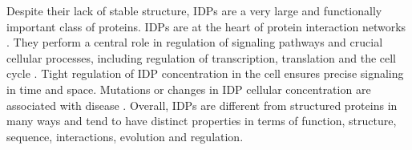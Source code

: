 \documentclass[../talant.diss.submit.tex]{subfiles}
\begin{document}
Despite their lack of stable structure, IDPs are a very large and functionally
important class of proteins.  IDPs are at the heart of protein interaction
networks \cite{dunker:05f,kim:08r}. They perform a central role in regulation of
signaling pathways and crucial cellular processes, including regulation of
transcription, translation and the cell cycle
\cite{wright:99,iakoucheva:02i,galea:08r}. Tight regulation of IDP concentration
in the cell ensures precise signaling in time and space. Mutations or changes in
IDP cellular concentration are associated with disease
\cite{gsponer08t,babu11i}. Overall, IDPs are different from structured proteins
in many ways and tend to have distinct properties in terms of function,
structure, sequence, interactions, evolution and regulation.
%
%
%
\end{document}
